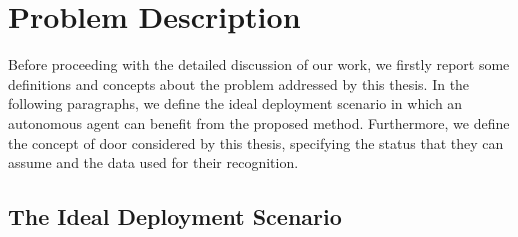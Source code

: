 \section{Problem Description}

Before proceeding with the detailed discussion of our work, we firstly report some definitions and concepts about the problem addressed by this thesis. In the following paragraphs, we define the ideal deployment scenario in which an autonomous agent can benefit from the proposed method. Furthermore, we define the concept of door considered by this thesis, specifying the status that they can assume and the data used for their recognition.

\subsection{The Ideal Deployment Scenario}

